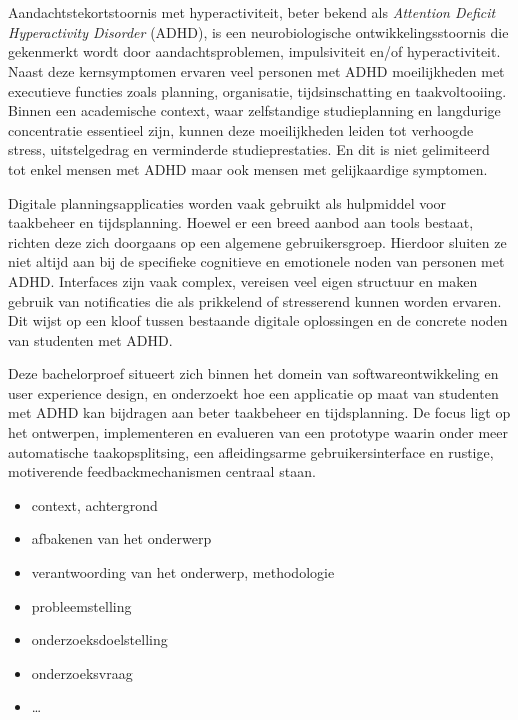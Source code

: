 
\chapter{}%
\label{ch:inleiding}

Aandachtstekortstoornis met hyperactiviteit, beter bekend als \textit{Attention Deficit Hyperactivity Disorder} (ADHD), is een neurobiologische ontwikkelingsstoornis die gekenmerkt wordt door aandachtsproblemen, impulsiviteit en/of hyperactiviteit. Naast deze kernsymptomen ervaren veel personen met ADHD moeilijkheden met executieve functies zoals planning, organisatie, tijdsinschatting en taakvoltooiing. Binnen een academische context, waar zelfstandige studieplanning en langdurige concentratie essentieel zijn, kunnen deze moeilijkheden leiden tot verhoogde stress, uitstelgedrag en verminderde studieprestaties. En dit is niet gelimiteerd tot enkel mensen met ADHD maar ook mensen met gelijkaardige symptomen.

Digitale planningsapplicaties worden vaak gebruikt als hulpmiddel voor taakbeheer en tijdsplanning. Hoewel er een breed aanbod aan tools bestaat, richten deze zich doorgaans op een algemene gebruikersgroep. Hierdoor sluiten ze niet altijd aan bij de specifieke cognitieve en emotionele noden van personen met ADHD. Interfaces zijn vaak complex, vereisen veel eigen structuur en maken gebruik van notificaties die als prikkelend of stresserend kunnen worden ervaren. Dit wijst op een kloof tussen bestaande digitale oplossingen en de concrete noden van studenten met ADHD.

Deze bachelorproef situeert zich binnen het domein van softwareontwikkeling en user experience design, en onderzoekt hoe een applicatie op maat van studenten met ADHD kan bijdragen aan beter taakbeheer en tijdsplanning. De focus ligt op het ontwerpen, implementeren en evalueren van een prototype waarin onder meer automatische taakopsplitsing, een afleidingsarme gebruikersinterface en rustige, motiverende feedbackmechanismen centraal staan.

\begin{itemize}
  \item context, achtergrond
  \item afbakenen van het onderwerp
  \item verantwoording van het onderwerp, methodologie
  \item probleemstelling
  \item onderzoeksdoelstelling
  \item onderzoeksvraag
  \item \ldots
\end{itemize}

